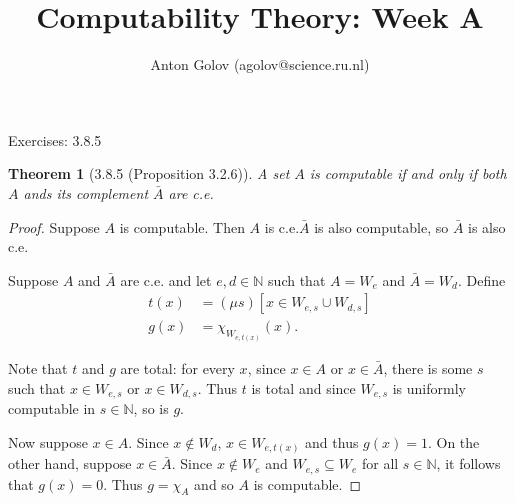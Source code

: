 \documentclass{article}
\title{Computability Theory: Week A}
\author{Anton Golov (agolov@science.ru.nl)}
\newtheorem{theorem}{Theorem}
\begin{document}
  \maketitle

  Exercises: 3.8.5

  \begin{theorem}[3.8.5 (Proposition 3.2.6)]
    A set $A$ is computable if and only if both $A$ ands its complement $\bar A$ are c.e.
  \end{theorem}

  \begin{proof}
    Suppose $A$ is computable.  Then $A$ is c.e.\@and $\bar A$ is also computable, so $\bar A$ is also c.e.

    Suppose $A$ and $\bar A$ are c.e. and let $e, d \in \mathbb{N}$ such that $A = W_e$ and $\bar A = W_d$.
    Define
    \begin{align*}
      t(x) &= (\mu s)[x \in W_{e, s} \cup W_{d, s}]\\
      g(x) &= \chi_{W_{e, t(x)}}(x).
    \end{align*}

    Note that $t$ and $g$ are total: for every $x$, since $x \in A$ or $x \in \bar A$, there is some $s$ such that
    $x \in W_{e,s}$ or $x \in W_{d,s}$.  Thus $t$ is total and since $W_{e,s}$ is uniformly computable in
    $s \in \mathbb{N}$, so is $g$.

    Now suppose $x \in A$.  Since $x \not \in W_d$, $x \in W_{e,t(x)}$ and thus $g(x) = 1$.  On the other hand, suppose
    $x \in \bar A$.  Since $x \not \in W_e$ and $W_{e, s} \subseteq W_e$ for all $s \in \mathbb{N}$, it follows that
    $g(x) = 0$.  Thus $g = \chi_A$ and so $A$ is computable.
  \end{proof}
\end{document}
